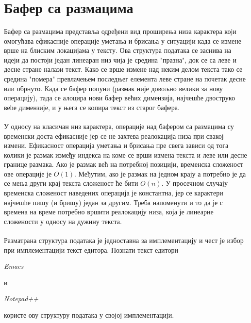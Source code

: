 \documentclass[12pt,oneside]{memoir}
\begin{document}
\section{Бафер са размацима}
\paragraph{}
Бафер са размацима представља одређени вид проширења низа карактера који омогућава
ефикасније операције уметања и брисања у ситуацији када се измене врше на блиским
локацијама у тексту. Ова структура података се заснива на идеји да постоји један линеаран низ чија је средина "празна", док се са леве и десне стране налази текст.
Како се врше измене над неким делом текста тако се средина "помера" превлачењем последњег елемента леве стране на почетак десне или обрнуто. Када се бафер попуни (размак није довољно велики за нову операцију), тада се алоцира нови бафер већих димензија, најчешће двоструко веће димензије, и у њега се копира текст из старог бафера.

\paragraph{}
У односу на класичан низ карактера, операције над бафером са размацима су временски доста ефикасније јер се не захтева реалокација низа при свакој измени. Ефикасност операција уметања и брисања пре свега зависи од тога колики је размак између индекса на коме се  
врши измена текста и леве или десне границе размака. Ако је размак већ на потребној позицији, временска сложеност ове операције је \(O(1)\). Међутим, ако је размак на једном крају а
потребно је да се мења други крај текста сложеност ће бити \(O(n)\). У просечном случају
временска сложеност наведених операција је константна, јер се карактери најчешће пишу (и бришу) један за другим. Треба напоменути и то да је с времена на време потребно вршити
реалокацију низа, која је линеарне сложености у односу на дужину текста.

\paragraph{}
Разматрана структура података је једноставна за имплементацију и чест је избор
при имплементацији текст едитора. Познати текст едитори \begin{latinica}\textit{Emacs}\end{latinica} \cite{Emacs} и 
\begin{latinica}\textit{Notepad++}\end{latinica} \cite{Notepad++}
користе ову структуру података у својој имплементацији.
\end{document}
